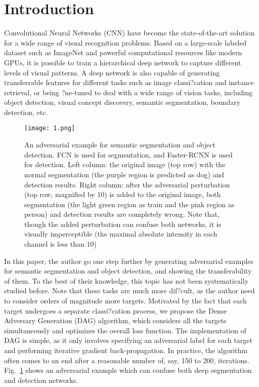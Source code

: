 \documentclass[10pt,twocolumn,letterpaper]{article}
\begin{document}
\section{Introduction}
Convolutional Neural Networks (CNN) have become the state-of-the-art solution for a wide range of visual recognition problems. Based on a large-scale labeled dataset such as ImageNet and powerful computational resources like modern GPUs, it is possible to train a hierarchical deep network to capture different levels of visual patterns\cite{1}. A deep network is also capable of generating transferrable features for different tasks such as image classi?cation and instance retrieval, or being ?ne-tuned to deal with a wide range of vision tasks, including object detection, visual concept discovery, semantic segmentation, boundary detection, etc.
\begin{figure}
\begin{center}
  \texttt{[image: 1.png]}\\
  \caption{An adversarial example for semantic segmentation and object detection. FCN is used for segmentation, and Faster-RCNN is used for detection. Left column: the original image (top row) with the normal segmentation (the purple region is predicted as dog) and detection results. Right column: after the adversarial perturbation (top row, magnified by 10) is added to the original image, both segmentation (the light green region as train and the pink region as person) and detection results are completely wrong. Note that, though the added perturbation can confuse both networks, it is visually imperceptible (the maximal absolute intensity in each channel is less than 10)}\label{1}
\end{center}
\end{figure}
\par
In this paper, the author go one step further by generating adversarial examples for semantic segmentation and object detection, and showing the transferability of them\cite{2}. To the best of their knowledge, this topic has not been systematically studied before. Note that these tasks are much more dif?cult, as the author need to consider orders of magnitude more targets. Motivated by the fact that each target undergoes a separate classi?cation process, we propose the Dense Adversary Generation (DAG) algorithm, which considers all the targets simultaneously and optimizes the overall loss function. The implementation of DAG is simple, as it only involves specifying an adversarial label for each target and performing iterative gradient back-propagation. In practice, the algorithm often comes to an end after a reasonable number of, say, 150 to 200, iterations. Fig.~\ref{1} shows an adversarial example which can confuse both deep segmentation and detection networks\cite{3}.
\end{document}
